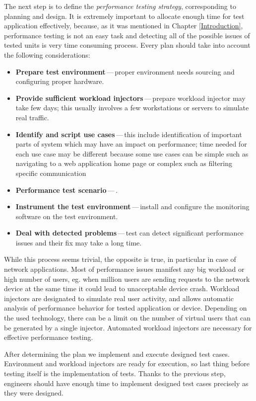 The next step is to define the \emph{performance testing strategy}, corresponding to planning and design. It is extremely important to allocate enough time for test application effectively, because, as it was mentioned in Chapter \ref{Introduction}, performance testing is not an easy task and detecting all of the possible issues of tested units is very time consuming process. Every plan should take into account the following considerations:

\begin{itemize}
	\setlength\itemsep{0em}
	\item \textbf{Prepare test environment}\,---\,proper environment needs sourcing and configuring proper hardware.
	\item \textbf{Provide sufficient workload injectors}\,---\,prepare workload injector may take few days; this usually involves a few workstations or servers to simulate real traffic.
	\item \textbf{Identify and script use cases}\,---\,this include identification of important parts of system which may have an impact on performance; time needed for each use case may be different because some use cases can be simple such as navigating to a web application home page or complex such as filtering specific communication
	\item \textbf{Performance test scenario}\,---\,.
	\item \textbf{Instrument the test environment}\,---\,install and configure the monitoring software on the test environment.
	\item \textbf{Deal with detected problems}\,---\,test can detect significant performance issues and their fix may take a long time.
\end{itemize}

While this process seems trivial, the opposite is true, in particular in case of network applications. Most of performance issues manifest any big workload or high number of users, eg. when million users are sending requests to the network device at the same time it could lead to unacceptable device crash. Workload injectors are designated to simulate real user activity, and allows automatic analysis of performance behavior for tested application or device. Depending on the used technology, there can be a limit on the number of virtual users that can be generated by a single injector. Automated workload injectors are necessary for effective performance testing.

After determining the plan we implement and execute designed test cases. Environment and workload injectors are ready for execution, so last thing before testing itself is the implementation of tests. Thanks to the previous step, engineers should have enough time to implement designed test cases precisely as they were designed. 

